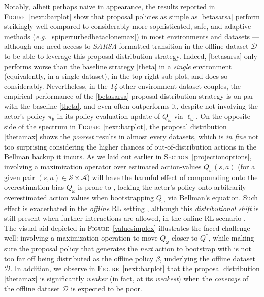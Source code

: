 Notably, albeit perhaps naive in appearance, the results reported in
\textsc{Figure}~\ref{next:barplot}
show that proposal policies as simple as \ref{betasarsa} perform strikingly well
compared to considerably more sophisticated, safe, and adaptive methods
(\textit{e.g.}~\ref{spiperturbedbetaclonemax})
in most environments and datasets
--- although one need access to \textit{SARSA}-formatted transition in the offline dataset $\mathcal{D}$
to be able to leverage this proposal distribution strategy.
Indeed, \ref{betasarsa} only performs worse than the baseline strategy \ref{theta} in a \emph{single}
environment (equivalently, in a single dataset), in the top-right sub-plot,
and does so considerably.
Nevertheless, in the \emph{14} other environment-dataset couples, the empirical performance of the
\ref{betasarsa} proposal distribution strategy is on par with the baseline \ref{theta}, and even often outperforms
it, despite not involving the actor's policy $\pi_\theta$
in its policy evaluation update of $Q_\omega$ via $\ell_\omega$.
On the opposite side of the spectrum in \textsc{Figure}~\ref{next:barplot},
the proposal distribution \ref{thetamax} shows the \emph{poorest} results in almost every datasets,
which is \textit{in fine} not too surprising considering the higher chances of
out-of-distribution actions in the Bellman backup it incurs.
As we laid out earlier in \textsc{Section}~\ref{projectionoptions},
involving a maximization operator over estimated action-values $Q_\omega(s,a)$ (for a given pair
$(s,a) \in \mathcal{S} \times \mathcal{A}$)
will have the harmful effect of compounding onto the overestimation bias $Q_\omega$ is prone to
\cite{Thrun1993-or},
locking the actor's policy onto arbitrarily overestimated action values when bootstrapping $Q_\omega$
via Bellman's equation.
Such effect is exacerbated in the \emph{offline} RL setting \cite{Levine2020-hz},
although this \textit{distributional shift} is still present when further interactions are allowed,
in the online RL scenario \cite{Fu2019-kb}.
The visual aid depicted in \textsc{Figure}~\ref{valuesimplex} illustrates the faced challenge well:
involving a maximization operation to move $Q_\omega$ closer to $Q^*$, while making sure the proposal policy
that generates the \textit{next} action to bootstrap with is not too far off being distributed as the offline policy
$\beta$, underlying the offline dataset $\mathcal{D}$.
In addition, we observe in \textsc{Figure}~\ref{next:barplot} that the proposal distribution \ref{thetamax} is
significantly \emph{weaker} (in fact, at its \emph{weakest})
when the \emph{coverage} of the offline dataset $\mathcal{D}$ is expected to be poor.
